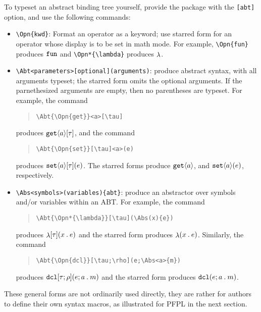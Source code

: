 \documentclass[11pt]{article}
\begin{document}
To typeset an abstract binding tree yourself, provide the package with the \verb|[abt]| option, and use the following commands:
\begin{itemize}
  \item \verb|\Opn{kwd}|: Format an operator as a keyword; use starred form for an operator whose display is to be set in math mode.  For example, \verb|\Opn{fun}| produces $\Opn{fun}$ and \verb|\Opn*{\lambda}| produces $\Opn*{\lambda}$.
  \item \verb|\Abt<parameters>[optional](arguments)|: produce abstract syntax, with all arguments typeset; the starred form omits the optional arguments.  If the parnethesized arguments are empty, then no parentheses are typeset.  For example, the command
  \begin{quote}
\begin{verbatim}
\Abt{\Opn{get}}<a>[\tau]
\end{verbatim}
\end{quote}
 produces $\Abt{\Opn{get}}<a>[\tau]$, and the command
  \begin{quote}
\begin{verbatim}
\Abt{\Opn{set}}[\tau]<a>(e)
\end{verbatim}
  \end{quote}
  produces $\Abt{\Opn{set}}<a>[\tau](e)$.  The starred forms produce $\Abt*{\Opn{get}}<a>[\tau]$, and $\Abt*{\Opn{set}}<a>[\tau](e)$, respectively.

  \item \verb|\Abs<symbols>(variables){abt}|: produce an abstractor over symbols and/or variables within an ABT.  For example, the command
  \begin{quote}
\begin{verbatim}
\Abt{\Opn*{\lambda}}[\tau](\Abs(x){e})
\end{verbatim}
  \end{quote}
  produces $\Abt{\Opn*{\lambda}}[\tau](\Abs(x){e})$ and the starred form produces $\Abt*{\Opn*{\lambda}}[\tau](\Abs(x){e})$.  Similarly, the command
  \begin{quote}
\begin{verbatim}
\Abt{\Opn{dcl}}[\tau;\rho](e;\Abs<a>{m})
\end{verbatim}
  \end{quote}
  produces $\Abt{\Opn{dcl}}[\tau;\rho](e;\Abs<a>{m})$ and the starred form produces $\Abt*{\Opn{dcl}}[\tau\,\rho](e;\Abs<a>{m})$.
\end{itemize}

These general forms are not ordinarily used directly, they are rather for authors to define their own syntax macros, as illustrated for \textsf{PFPL} in the next section.
\end{document}
